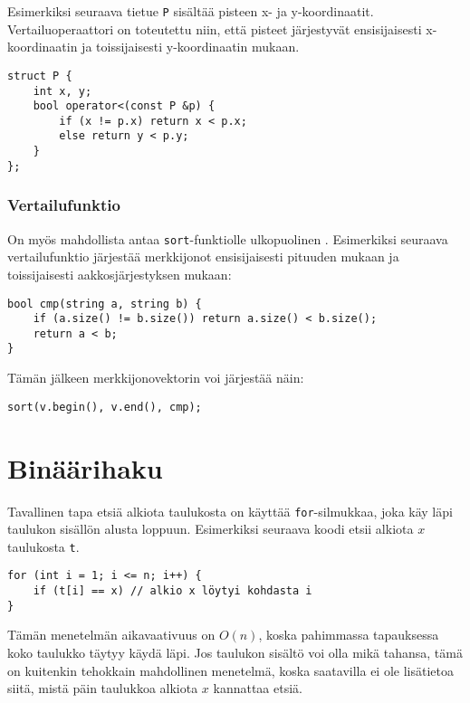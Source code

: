 Esimerkiksi seuraava tietue \texttt{P}
sisältää pisteen x- ja y-koordinaatit.
Vertailuoperaattori on toteutettu niin,
että pisteet järjestyvät ensisijaisesti x-koor\-di\-naa\-tin
ja toissijaisesti y-koordinaatin mukaan.

\begin{lstlisting}
struct P {
    int x, y;
    bool operator<(const P &p) {
        if (x != p.x) return x < p.x;
        else return y < p.y;
    }
};
\end{lstlisting}

\subsubsection{Vertailufunktio}


On myös mahdollista antaa
\texttt{sort}-funktiolle ulkopuolinen .
Esimerkiksi seuraava vertailufunktio
järjestää merkkijonot ensisijaisesti pituuden mukaan
ja toissijaisesti aakkosjärjestyksen mukaan:

\begin{lstlisting}
bool cmp(string a, string b) {
    if (a.size() != b.size()) return a.size() < b.size();
    return a < b;
}
\end{lstlisting}
Tämän jälkeen merkkijonovektorin voi järjestää näin:
\begin{lstlisting}
sort(v.begin(), v.end(), cmp);
\end{lstlisting}

\section{Binäärihaku}


Tavallinen tapa etsiä alkiota taulukosta
on käyttää \texttt{for}-silmukkaa, joka käy läpi
taulukon sisällön alusta loppuun.
Esimerkiksi seuraava koodi etsii alkiota
$x$ taulukosta \texttt{t}.

\begin{lstlisting}
for (int i = 1; i <= n; i++) {
    if (t[i] == x) // alkio x löytyi kohdasta i
}
\end{lstlisting}

Tämän menetelmän aikavaativuus on $O(n)$,
koska pahimmassa tapauksessa koko taulukko täytyy
käydä läpi.
Jos taulukon sisältö voi olla mikä tahansa,
tämä on kuitenkin tehokkain mahdollinen menetelmä,
koska saatavilla ei ole lisätietoa siitä,
mistä päin taulukkoa alkiota $x$ kannattaa etsiä.


